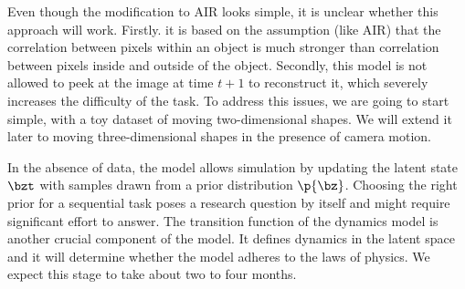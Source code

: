         Even though the modification to AIR looks simple, it is unclear whether this approach will work. Firstly. it is based on the assumption (like AIR) that the correlation between pixels within an object is much stronger than correlation between pixels inside and outside of the object. Secondly, this model is not allowed to peek at the image at time $t+1$ to reconstruct it, which severely increases the difficulty of the task. To address this issues, we are going to start simple, with a toy dataset of moving two-dimensional shapes. We will extend it later to moving three-dimensional shapes in the presence of camera motion.
        
        In the absence of data, the model allows simulation by updating the latent state $\bzt$ with samples drawn from a prior distribution $\p{\bz}$.
        Choosing the right prior for a sequential task poses a research question by itself \citep{Soelch2016} and might require significant effort to answer.
        The transition function of the dynamics model is another crucial component of the model. It defines dynamics in the latent space and it will determine whether the model adheres to the laws of physics.
        We expect this stage to take about two to four months.
        
